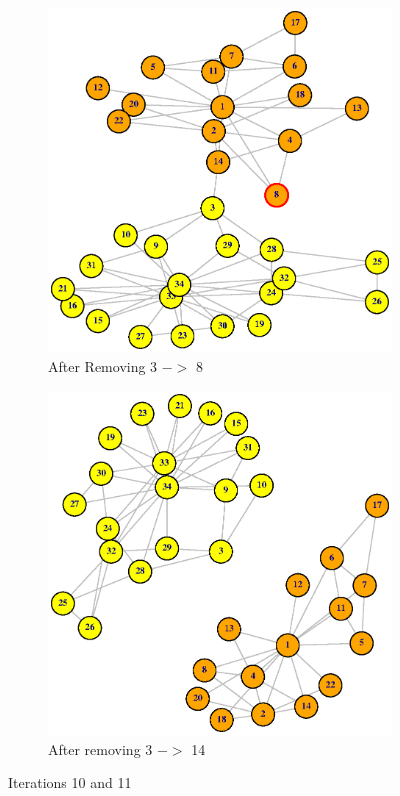 \documentclass[12pt,letterpaper]{article}
\begin{document}
%
\begin{figure}
\centering
\begin{subfigure}{.5\textwidth}
  \centering
  \includegraphics[width=.9\linewidth]{Plot11}
  \caption{After Removing 3 $->$ 8 }
  \label{fig:sub1}
\end{subfigure}%
\begin{subfigure}{.5\textwidth}
  \centering
  \includegraphics[width=.9\linewidth]{Plot12}
  \caption{After removing 3 $->$ 14}
  \label{fig:sub2}
\end{subfigure}
\caption{Iterations 10 and 11}
\label{fig:test}
\end{figure}
\end{document}
